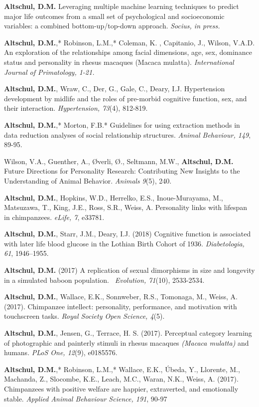 \documentclass[margin,line]{res}
\begin{document}
\begin{resume}
{\bf Altschul, D.M.}  Leveraging multiple machine learning techniques to predict major life outcomes from a small set of psychological and socioeconomic variables: a combined bottom-up/top-down approach. {\it Socius, in press.}

{\bf Altschul, D.M.},* Robinson, L.M.,* Coleman, K. , Capitanio, J., Wilson, V.A.D. An exploration of the relationships among facial dimensions, age, sex, dominance
status and personality in rhesus macaques (Macaca mulatta). {\it International Journal of Primatology, 1-21.}

{\bf Altschul, D.M.}, Wraw, C., Der, G., Gale, C., Deary, I.J. Hypertension development by midlife and the roles of pre-morbid cognitive function, sex, and their interaction. {\it Hypertension, 73}(4), 812-819.

{\bf Altschul, D.M.},* Morton, F.B.* Guidelines for using extraction methods in data reduction analyses of social relationship structures.  {\it Animal Behaviour, 149}, 89-95.

Wilson, V.A., Guenther, A., Øverli, Ø., Seltmann, M.W., {\bf Altschul, D.M.} Future Directions for Personality Research: Contributing New Insights to the Understanding of Animal Behavior. {\it Animals 9}(5), 240.

{\bf Altschul, D.M.}, Hopkins, W.D., Herrelko, E.S., Inoue-Murayama, M., Matsuzawa, T., King, J.E., Ross, S.R., Weiss, A. Personality links with lifespan in chimpanzees. {\it eLife, 7}, e33781.

{\bf Altschul, D.M.}, Starr, J.M., Deary, I.J. (2018) Cognitive function is associated with later life blood glucose in the Lothian Birth Cohort of 1936. {\it Diabetologia, 61}, 1946–1955.

{\bf Altschul, D.M.} (2017) A replication of sexual dimorphisms in size and longevity in a simulated baboon population. {\it\ Evolution, 71}(10), 2533-2534.

{\bf Altschul, D.M.}, Wallace, E.K., Sonnweber, R.S., Tomonaga, M., Weiss, A. (2017). Chimpanzee intellect: personality, performance, and motivation with touchscreen tasks. {\it Royal Society Open Science, 4}(5).

{\bf Altschul, D.M.}, Jensen, G.,  Terrace, H. S. (2017). Perceptual category learning of photographic and painterly stimuli in rhesus macaques {\it (Macaca mulatta)} and humans.  {\it PLoS One, 12}(9), e0185576.

{\bf Altschul, D.M.},* Robinson, L.M.,* Wallace, E.K., \'{U}beda, Y., Llorente, M., Machanda, Z., Slocombe, K.E., Leach, M.C., Waran, N.K., Weiss, A. (2017). Chimpanzees with positive welfare are happier, extraverted, and emotionally stable. {\it Applied Animal Behaviour Science, 191}, 90-97


\end{resume}
\end{document}
